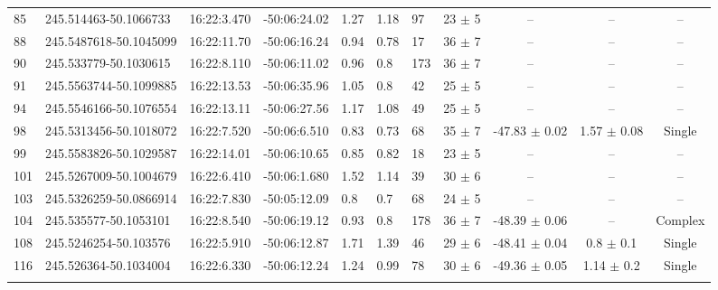 \documentclass[longauth]{aa} %
\begin{document}
\begin{appendix}
\begin{table}[htbp!]
\begin{tabular}{llllllllccc}
85  &  245.514463-50.1066733  &  16:22:3.470  &  -50:06:24.02  &  1.27  &  1.18  &  97  &  23 $\pm$ 5  &  --  &  --  &  -- \\
88  &  245.5487618-50.1045099  &  16:22:11.70  &  -50:06:16.24  &  0.94  &  0.78  &  17  &  36 $\pm$ 7  &  --  &  --  &  -- \\
90  &  245.533779-50.1030615  &  16:22:8.110  &  -50:06:11.02  &  0.96  &  0.8  &  173  &  36 $\pm$ 7  &  --  &  --  &  -- \\
91  &  245.5563744-50.1099885  &  16:22:13.53  &  -50:06:35.96  &  1.05  &  0.8  &  42  &  25 $\pm$ 5  &  --  &  --  &  -- \\
94  &  245.5546166-50.1076554  &  16:22:13.11  &  -50:06:27.56  &  1.17  &  1.08  &  49  &  25 $\pm$ 5  &  --  &  --  &  -- \\
98  &  245.5313456-50.1018072  &  16:22:7.520  &  -50:06:6.510  &  0.83  &  0.73  &  68  &  35 $\pm$ 7  &  -47.83 $\pm$ 0.02  &  1.57 $\pm$ 0.08  &  Single \\
99  &  245.5583826-50.1029587  &  16:22:14.01  &  -50:06:10.65  &  0.85  &  0.82  &  18  &  23 $\pm$ 5  &  --  &  --  &  -- \\
101  &  245.5267009-50.1004679  &  16:22:6.410  &  -50:06:1.680  &  1.52  &  1.14  &  39  &  30 $\pm$ 6  &  --  &  --  &  -- \\
103  &  245.5326259-50.0866914  &  16:22:7.830  &  -50:05:12.09  &  0.8  &  0.7  &  68  &  24 $\pm$ 5  &  --  &  --  &  -- \\
104  &  245.535577-50.1053101  &  16:22:8.540  &  -50:06:19.12  &  0.93  &  0.8  &  178  &  36 $\pm$ 7  &  -48.39 $\pm$ 0.06  &  --  &  Complex \\
108  &  245.5246254-50.103576  &  16:22:5.910  &  -50:06:12.87  &  1.71  &  1.39  &  46  &  29 $\pm$ 6  &  -48.41 $\pm$ 0.04  &  0.8 $\pm$ 0.1  &  Single \\
116  &  245.526364-50.1034004  &  16:22:6.330  &  -50:06:12.24  &  1.24  &  0.99  &  78  &  30 $\pm$ 6  &  -49.36 $\pm$ 0.05  &  1.14 $\pm$ 0.2  &  Single \\
\hline \noalign {\smallskip}

\end{tabular}
\end{table}


\end{appendix}
\end{document}
